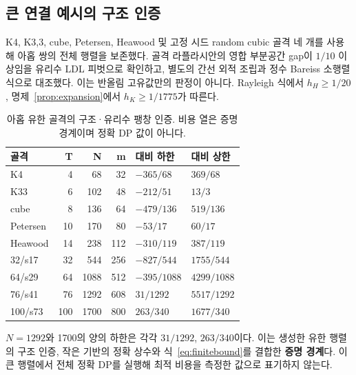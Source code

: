 \documentclass[11pt,a4paper]{article}
\theoremstyle{definition}
\theoremstyle{remark}\newtheorem{remark}[theorem]{주석}
\begin{document}
\subsection{큰 연결 예시의 구조 인증}
K4, K3,3, cube, Petersen, Heawood 및 고정 시드 random cubic 골격 네 개를 사용해 아홉 쌍의 전체 행렬을 보존했다. 골격 라플라시안의 영합 부분공간 gap이 $1/10$ 이상임을 유리수 LDL 피벗으로 확인하고, 별도의 간선 외적 조립과 정수 Bareiss 소행렬식으로 대조했다. 이는 반올림 고유값만의 판정이 아니다. Rayleigh 식에서 $h_H\ge1/20$, 명제~\ref{prop:expansion}에서 $h_K\ge1/1775$가 따른다.

\begin{table}[htbp]
\centering\small
\caption{아홉 유한 골격의 구조·유리수 팽창 인증. 비용 열은 증명 경계이며 정확 DP 값이 아니다.}\label{tab:expanders}
\begin{tabular}{lrrrll}\toprule
골격 & T & N & m & 대비 하한 & 대비 상한\\\midrule
K4 & 4 & 68 & 32 & $-365/68$ & $369/68$\\
K33 & 6 & 102 & 48 & $-212/51$ & $13/3$\\
cube & 8 & 136 & 64 & $-479/136$ & $519/136$\\
Petersen & 10 & 170 & 80 & $-53/17$ & $60/17$\\
Heawood & 14 & 238 & 112 & $-310/119$ & $387/119$\\
32/s17 & 32 & 544 & 256 & $-827/544$ & $1755/544$\\
64/s29 & 64 & 1088 & 512 & $-395/1088$ & $4299/1088$\\
76/s41 & 76 & 1292 & 608 & $31/1292$ & $5517/1292$\\
100/s73 & 100 & 1700 & 800 & $263/340$ & $1677/340$\\
\bottomrule\end{tabular}

\end{table}

$N=1292$와 1700의 양의 하한은 각각 $31/1292$, $263/340$이다. 이는 생성한 유한 행렬의 구조 인증, 작은 기반의 정확 상수와 식~\eqref{eq:finitebound}를 결합한 \textbf{증명 경계}다. 이 큰 행렬에서 전체 정확 DP를 실행해 최적 비용을 측정한 값으로 표기하지 않는다.
\end{document}
